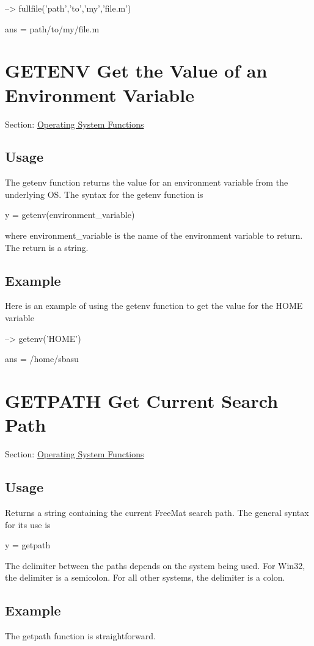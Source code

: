 \begin{DoxyVerbInclude}
--> fullfile('path','to','my','file.m')

ans = 
path/to/my/file.m
\end{DoxyVerbInclude}
 \hypertarget{os_getenv}{}\section{G\-E\-T\-E\-N\-V Get the Value of an Environment Variable}\label{os_getenv}
Section\-: \hyperlink{sec_os}{Operating System Functions} \hypertarget{vtkwidgets_vtkxyplotwidget_Usage}{}\subsection{Usage}\label{vtkwidgets_vtkxyplotwidget_Usage}
The {\ttfamily getenv} function returns the value for an environment variable from the underlying O\-S. The syntax for the {\ttfamily getenv} function is \begin{DoxyVerb}   y = getenv(environment_variable)
\end{DoxyVerb}
 where {\ttfamily environment\-\_\-variable} is the name of the environment variable to return. The return is a string. \hypertarget{variables_struct_Example}{}\subsection{Example}\label{variables_struct_Example}
Here is an example of using the {\ttfamily getenv} function to get the value for the {\ttfamily H\-O\-M\-E} variable


\begin{DoxyVerbInclude}
--> getenv('HOME')

ans = 
/home/sbasu
\end{DoxyVerbInclude}
 \hypertarget{os_getpath}{}\section{G\-E\-T\-P\-A\-T\-H Get Current Search Path}\label{os_getpath}
Section\-: \hyperlink{sec_os}{Operating System Functions} \hypertarget{vtkwidgets_vtkxyplotwidget_Usage}{}\subsection{Usage}\label{vtkwidgets_vtkxyplotwidget_Usage}
Returns a {\ttfamily string} containing the current Free\-Mat search path. The general syntax for its use is \begin{DoxyVerb}  y = getpath
\end{DoxyVerb}
 The delimiter between the paths depends on the system being used. For Win32, the delimiter is a semicolon. For all other systems, the delimiter is a colon.\hypertarget{variables_struct_Example}{}\subsection{Example}\label{variables_struct_Example}
The {\ttfamily getpath} function is straightforward.


